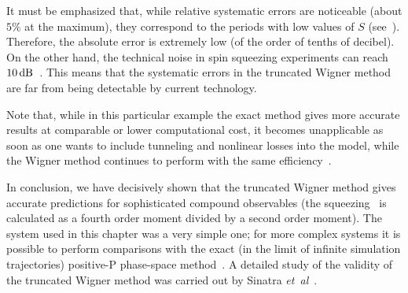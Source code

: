 It must be emphasized that, while relative systematic errors are noticeable (about $5\%$ at the maximum), they correspond to the periods with low values of $S$ (see~).
Therefore, the absolute error is extremely low (of the order of tenths of decibel).
On the other hand, the technical noise in spin squeezing experiments can reach $10\mbox{\ensuremath{\,\mathrm{dB}}}$~\cite{Riedel2010}.
This means that the systematic errors in the truncated Wigner method are far from being detectable by current technology.

Note that, while in this particular example the exact method gives more accurate results at comparable or lower computational cost, it becomes unapplicable as soon as one wants to include tunneling and nonlinear losses into the model, while the Wigner method continues to perform with the same efficiency~\cite{Opanchuk2012a}.

In conclusion, we have decisively shown that the truncated Wigner method gives accurate predictions for sophisticated compound observables (the squeezing~ is calculated as a fourth order moment divided by a second order moment).
The system used in this chapter was a very simple one; for more complex systems it is possible to perform comparisons with the exact (in the limit of infinite simulation trajectories) positive-P phase-space method~\cite{Drummond1993,Chaturvedi2002,Dechoum2004}.
A detailed study of the validity of the truncated Wigner method was carried out by Sinatra \textit{et~al}~\cite{Sinatra2002}.
